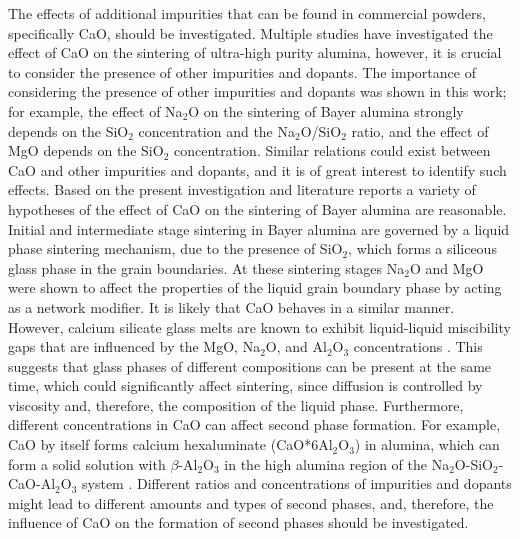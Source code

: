 The effects of additional impurities that can be found in commercial powders, specifically CaO, should be investigated. Multiple studies have investigated the effect of CaO on the sintering of ultra-high purity alumina, however, it is crucial to consider the presence of other impurities and dopants. The importance of considering the presence of other impurities and dopants was shown in this work; for example, the effect of Na$_{2}$O on the sintering of Bayer alumina strongly depends on the SiO$_{2}$ concentration and the Na$_{2}$O/SiO$_{2}$ ratio, and the effect of MgO depends on the SiO$_{2}$ concentration. Similar relations could exist between CaO and other impurities and dopants, and it is of great interest to identify such effects. Based on the present investigation and literature reports a variety of hypotheses of the effect of CaO on the sintering of Bayer alumina are reasonable. Initial and intermediate stage sintering in Bayer alumina are governed by a liquid phase sintering mechanism, due to the presence of SiO$_{2}$, which forms a siliceous glass phase in the grain boundaries. At these sintering stages Na$_{2}$O and MgO were shown to affect the properties of the liquid grain boundary phase by acting as a network modifier. It is likely that CaO behaves in a similar manner. However, calcium silicate glass melts are known to exhibit liquid-liquid miscibility gaps that are influenced by the MgO, Na$_{2}$O, and Al$_{2}$O$_{3}$ concentrations \cite{Kingery1983}. This suggests that glass phases of different compositions can be present at the same time, which could significantly affect sintering, since diffusion is controlled by viscosity and, therefore, the composition of the liquid phase. Furthermore, different concentrations in CaO can affect second phase formation. For example, CaO by itself forms calcium hexaluminate (CaO*6Al$_{2}$O$_{3}$) in alumina, which can form a solid solution with $\beta$-Al$_{2}$O$_{3}$ in the high alumina region of the Na$_{2}$O-SiO$_{2}$-CaO-Al$_{2}$O$_{3}$ system \cite{Vries1969}. Different ratios and concentrations of impurities and dopants might lead to different amounts and types of second phases, and, therefore, the influence of CaO on the formation of second phases should be investigated.

